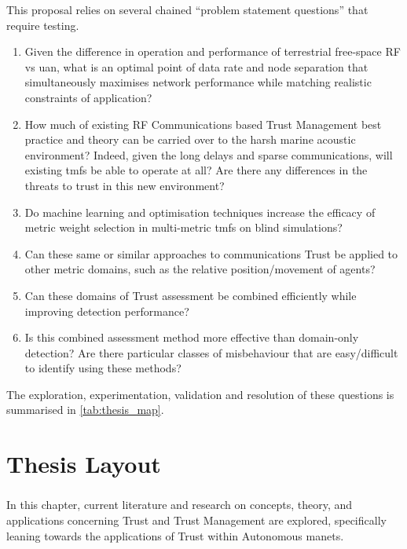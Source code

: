 This proposal relies on several chained ``problem statement questions'' that require testing.
\begin{enumerate}[label=\textbf{PSQ.\arabic*},ref=\emph{PSQ. \arabic*}]
	\item Given the difference in operation and performance of terrestrial free-space RF vs \gls{uan}, what is an optimal point of data rate and node separation that simultaneously maximises network performance while matching realistic constraints of application? \label{q:rfuan}
	\item How much of existing RF Communications based Trust Management best practice and theory can be carried over to the harsh marine acoustic environment? Indeed, given the long delays and sparse communications, will existing \glspl{tmf} be able to operate at all? Are there any differences in the threats to trust in this new environment? \label{q:uantmf}
	\item Do machine learning and optimisation techniques increase the efficacy of metric weight selection in multi-metric \glspl{tmf} on blind simulations?\label{q:ml}
	\item Can these same or similar approaches to communications Trust be applied to other metric domains, such as the relative position/movement of agents?\label{q:phys}
	\item Can these domains of Trust assessment be combined efficiently while improving detection performance? \label{q:joint}
	\item Is this combined assessment method more effective than domain-only detection? Are there particular classes of misbehaviour that are easy/difficult to identify using these methods? \label{q:perf}
\end{enumerate}

The exploration, experimentation, validation and resolution of these questions is summarised in \autoref{tab:thesis_map}.


\section{Thesis Layout}

\subsubsection{}
In this chapter, current literature and research on concepts, theory, and applications concerning Trust and Trust Management are explored, specifically leaning towards the applications of Trust within Autonomous \glspl{manet}.

